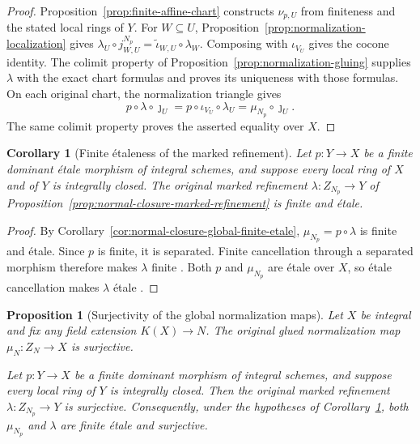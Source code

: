 \documentclass[11pt]{article}
\newtheorem{proposition}[theorem]{Proposition}
\newtheorem{corollary}[theorem]{Corollary}
\theoremstyle{definition}
\theoremstyle{remark}
\begin{document}
\begin{proof}
Proposition~\ref{prop:finite-affine-chart} constructs \(\nu_{p,U}\)
from finiteness and the stated local rings of \(Y\). For
\(W\subseteq U\), Proposition~\ref{prop:normalization-localization}
gives \(\lambda_U\circ j^{N_p}_{W,U}
=\widetilde\iota_{W,U}\circ\lambda_W\). Composing with
\(\iota_{V_U}\) gives the cocone identity. The colimit property of
Proposition~\ref{prop:normalization-gluing} supplies \(\lambda\) with
the exact chart formulas and proves its uniqueness with those formulas.
On each original chart, the normalization triangle gives
\[
 p\circ\lambda\circ\jmath_U
 =p\circ\iota_{V_U}\circ\lambda_U
 =\mu_{N_p}\circ\jmath_U.
\]
The same colimit property proves the asserted equality over \(X\).
\end{proof}

\begin{corollary}[Finite \'{e}taleness of the marked refinement]
\label{cor:normal-closure-refinement-finite-etale}
Let \(p:Y\to X\) be a finite dominant \'{e}tale morphism of integral
schemes, and suppose every local ring of \(X\) and of \(Y\) is
integrally closed. The original marked refinement
\(\lambda:Z_{N_p}\to Y\) of
Proposition~\ref{prop:normal-closure-marked-refinement} is finite
and \'{e}tale.
\end{corollary}

\begin{proof}
By Corollary~\ref{cor:normal-closure-global-finite-etale},
\(\mu_{N_p}=p\circ\lambda\) is finite and \'{e}tale.
Since \(p\) is finite, it is separated. Finite cancellation through
a separated morphism therefore makes \(\lambda\) finite
\cite{StacksFiniteCancellation}. Both \(p\) and \(\mu_{N_p}\) are
\'{e}tale over \(X\), so \'{e}tale cancellation makes \(\lambda\)
\'{e}tale \cite{StacksEtaleCancellation}.
\end{proof}

\begin{proposition}[Surjectivity of the global normalization maps]
\label{prop:normalization-global-surjective}
Let \(X\) be integral and fix any field extension \(K(X)\to N\).
The original glued normalization map \(\mu_N:Z_N\to X\) is surjective.

Let \(p:Y\to X\) be a finite dominant morphism of integral schemes,
and suppose every local ring of \(Y\) is integrally closed. Then the
original marked refinement \(\lambda:Z_{N_p}\to Y\) is surjective.
Consequently, under the hypotheses of
Corollary~\ref{cor:normal-closure-refinement-finite-etale}, both
\(\mu_{N_p}\) and \(\lambda\) are finite \'{e}tale and surjective.
\end{proposition}
\end{document}
